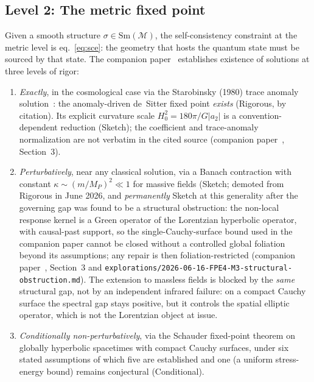 \documentclass[12pt,a4paper]{article}
\theoremstyle{definition}
\theoremstyle{remark}
\begin{document}
\subsection{Level 2: The metric fixed point}
\label{sec:level2}

Given a smooth structure $\sigma \in \mathrm{Sm}(\mathcal{M})$, the
self-consistency constraint at the metric level is
eq.~\eqref{eq:sce}: the geometry that hosts the quantum state must be
sourced by that state. The companion paper~\cite{fixed_point} establishes
existence of solutions at three levels of rigor:

\begin{enumerate}

\item \emph{Exactly}, in the cosmological case via the Starobinsky
(1980) trace anomaly solution~\cite{starobinsky}: the anomaly-driven
de~Sitter fixed point \emph{exists} (Rigorous, by citation). Its
explicit curvature scale $H_0^2 = 180\pi/G|a_2|$ is a
convention-dependent reduction (Sketch); the coefficient and
trace-anomaly normalization are not verbatim in the cited source
(companion paper~\cite{fixed_point}, Section~3).

\item \emph{Perturbatively}, near any classical solution, via a Banach
contraction with constant $\kappa \sim (m/M_P)^2 \ll 1$ for massive
fields (Sketch; demoted from Rigorous in June 2026, and \emph{permanently}
Sketch at this generality after the governing gap was found to be a
structural obstruction: the non-local response kernel is a Green operator of
the Lorentzian hyperbolic operator, with causal-past support, so the
single-Cauchy-surface bound used in the companion paper cannot be closed
without a controlled global foliation beyond its assumptions; any repair is
then foliation-restricted (companion paper~\cite{fixed_point}, Section~3 and
\texttt{explorations/2026-06-16-FPE4-M3-structural-obstruction.md}). The
extension to massless fields is blocked by the \emph{same} structural gap, not
by an independent infrared failure: on a compact Cauchy surface the spectral
gap stays positive, but it controls the spatial elliptic operator, which is
not the Lorentzian object at issue.

\item \emph{Conditionally non-perturbatively}, via the Schauder
fixed-point theorem on globally hyperbolic spacetimes with compact Cauchy
surfaces, under six stated assumptions of which five are established and
one (a uniform stress-energy bound) remains conjectural (Conditional).

\end{enumerate}
\end{document}
